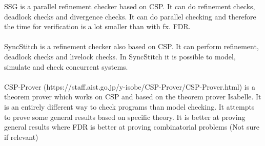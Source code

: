 \documentclass[a4paper]{report}
\begin{document}
SSG is a parallel refinement checker based on CSP. It can do refinement checks, deadlock checks and divergence checks. It can do parallel checking and therefore the time for verification is a lot smaller than with fx. FDR. \\\\

SyncStitch is a refinement checker also based on CSP. It can perform refinement, deadlock checks and livelock checks. In SyncStitch it is possible to model, simulate and check concurrent systems.  \\\\

CSP-Prover\cite{Isobe2005} (https://staff.aist.go.jp/y-isobe/CSP-Prover/CSP-Prover.html) is a theorem prover which works on CSP and based on the theorem prover Isabelle. It is an entirely different way to check programs than model checking. It attempts to prove some general results based on specific theory. It is better at proving general results where FDR is better at proving combinatorial problems (Not sure if relevant)
\end{document}
